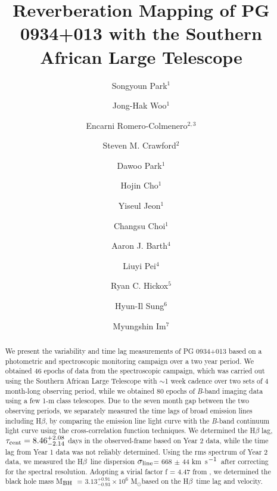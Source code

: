 \documentclass[iop]{emulateapj}
\newcommand{\Hb}{\rm H{$\beta$}}
\newcommand{\mbh}{M$_{\rm BH}$}
\newcommand{\msun}{M$_{\odot}$}
\newcommand{\kms}{km~s$^{\rm -1}$}
\newcommand{\sigmaline}{$\sigma_{\rm line}$}
\begin{document}
\title{Reverberation Mapping of PG 0934+013 with the Southern African Large Telescope}
\author{Songyoun Park$^{1}$}
\author{Jong-Hak Woo$^{1}$}
\author{Encarni Romero-Colmenero$^{2,3}$}
\author{Steven M. Crawford$^{2}$}
\author{Dawoo Park$^{1}$}
\author{Hojin Cho$^{1}$}
\author{Yiseul Jeon$^{1}$}
\author{Changsu Choi$^{1}$}
\author{Aaron J. Barth$^{4}$}
\author{Liuyi Pei$^{4}$}
\author{Ryan C. Hickox$^{5}$}
\author{Hyun-Il Sung$^{6}$}
\author{Myungshin Im$^{7}$}



\begin{abstract}
We present the variability and time lag measurements of PG 0934+013 based on a photometric and spectroscopic monitoring campaign
over a two year period.
We obtained 46 epochs of data from the spectroscopic campaign, which was carried out using the 
Southern African Large Telescope with $\sim$1 week cadence over two sets of 4 month-long observing period,
while we obtained 80 epochs of \textit{B}-band imaging data using a few 1-m class telescopes. 
Due to the seven month gap between the two observing periods, we separately measured the time lags of broad emission lines 
including H$\beta$, by comparing
the emission line light curve with the \textit{B}-band continuum light curve using the cross-correlation function techniques. 
We determined the H$\beta$ lag, $\tau_{\rm cent} = 8.46^{+2.08}_{-2.14}$ days in the observed-frame based on Year 2 data, while the time lag from Year 1 data was not reliably determined. Using the rms spectrum of Year 2 data, we measured the \Hb\ line dispersion \sigmaline = 668 $\pm$ 44 \kms\ after correcting for the spectral resolution. Adopting a virial factor f = 4.47 from \citet{Woo2015}, we determined the black hole mass \mbh\ = $3.13 ^{+0.91} _{-0.93} \times 10^{6}$ \msun based on the \Hb\ time lag and velocity. 

\end{abstract}
\end{document}
